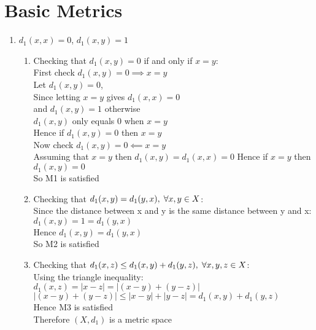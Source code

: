 \documentclass[,oneside]{article}
\numberwithin{equation}{section}
\begin{document}
    \section{\large{Basic Metrics}}
    \begin{enumerate}[label=(\roman*)]
       \item $d_1(x,x) = 0$, \hspace{0.1cm}$d_1(x,y) = 1$\\
       \begin{enumerate}[label=\alph*)]
       \item Checking that $d_1(x,y) = 0$ if and only if $x = y$:
        \\First check $d_1(x,y) = 0\implies x=y$
        \\Let $d_1(x,y)=0$, 
         \\Since letting $x=y$ gives $d_1(x,x) = 0$
         \\and $d_1(x,y)=1$ otherwise
         \\$d_1(x,y)$ only equals 0 when $x = y$\\
        Hence if $d_1(x,y) = 0$ then $x=y$\\
        
        Now check $d_1(x,y)=0 \impliedby x=y$\\
        Assuming that $x=y$ then $d_1(x,y)=d_1(x,x)=0$
        Hence if $x=y$ then $d_1(x,y)=0$\\
        So M1 is satisfied\\
        \item Checking that $d_1(x,y)=d_1(y,x),\hspace{0.1cm} \forall x,y \in X$:
        \\Since the distance between x and y is the same distance between y and x: $d_1(x,y)=1=d_1(y,x)$
        \\Hence $d_1(x,y)=d_1(y,x)$\\
        So M2 is satisfied\\
        \item Checking that $d_1(x,z) \leq d_1(x,y) + d_1(y,z), \hspace{0.1cm} \forall x,y,z \in X$:\\
        Using the triangle inequality:\\
        $d_1(x,z)=|x-z|=|(x-y)+(y-z)|$\\
        $|(x-y)+(y-z)|\leq|x-y|+|y-z|=d_1(x,y)+d_1(y,z)$\\
        Hence M3 is satisfied\\
        Therefore $(X, d_1)$ is a metric space\\
        

\end{enumerate}
\end{enumerate}
\end{document}

